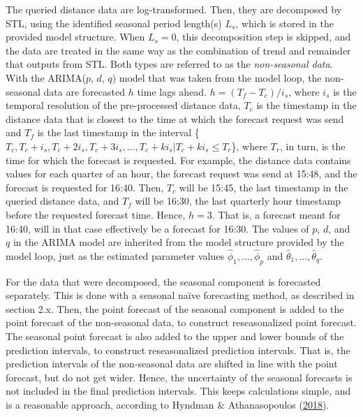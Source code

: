 \documentclass[12pt,oneside]{reedthesis}
\begin{document}
The queried distance data are log-transformed. Then, they are decomposed
by STL, using the identified seasonal period length(s) \(L_{s}\), which
is stored in the provided model structure. When \(L_{s} = 0\), this
decomposition step is skipped, and the data are treated in the same way
as the combination of trend and remainder that outputs from STL. Both
types are referred to as the \emph{non-seasonal data}. With the
ARIMA(\(p\), \(d\), \(q\)) model that was taken from the model loop, the
non-seasonal data are forecasted \(h\) time lags ahead.
\(h = (T_{f} - T_{c}) / i_{s}\), where \(i_{s}\) is the temporal
resolution of the pre-processed distance data, \(T_{c}\) is the
timestamp in the distance data that is closest to the time at which the
forecast request was send and \(T_{f}\) is the last timestamp in the
interval
\{\(T_{c}, T_{c} + i_{s}, T_{c} + 2i_{s}, T_{c} + 3i_{s}, ..., T_{c} + ki_{s} | T_{c} + ki_{s} \leq T_{r}\)\},
where \(T_{r}\), in turn, is the time for which the forecast is
requested. For example, the distance data contains values for each
quarter of an hour, the forecast request was send at 15:48, and the
forecast is requested for 16:40. Then, \(T_{c}\) will be 15:45, the last
timestamp in the queried distance data, and \(T_{f}\) will be 16:30, the
last quarterly hour timestamp before the requested forecast time. Hence,
\(h = 3\). That is, a forecast meant for 16:40, will in that case
effectively be a forecast for 16:30. The values of \(p\), \(d\), and
\(q\) in the ARIMA model are inherited from the model structure provided
by the model loop, just as the estimated parameter values
\(\hat\phi_{1},...,\hat\phi_{p}\) and
\(\hat\theta_{1},...,\hat\theta_{q}\).

For the data that were decomposed, the seasonal component is forecasted
separately. This is done with a seasonal naïve forecasting method, as
described in section 2.x. Then, the point forecast of the seasonal
component is added to the point forecast of the non-seasonal data, to
construct reseasonalized point forecast. The seasonal point forecast is
also added to the upper and lower bounds of the prediction intervals, to
construct reseasonalized prediction intervals. That is, the prediction
intervals of the non-seasonal data are shifted in line with the point
forecast, but do not get wider. Hence, the uncertainty of the seasonal
forecasts is not included in the final prediction intervals. This keeps
calculations simple, and is a reasonable approach, according to Hyndman
\& Athanasopoulos (\protect\hyperlink{ref-hyndman2018fpp}{2018}).
\end{document}
